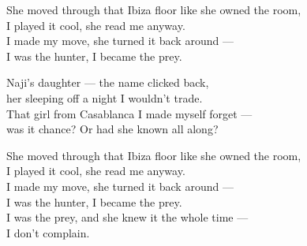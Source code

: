 \begin{lyrics}
She moved through that Ibiza floor like she owned the room,\\
I played it cool, she read me anyway.\\
I made my move, she turned it back around —\\
I was the hunter, I became the prey.

Naji's daughter — the name clicked back,\\
her sleeping off a night I wouldn't trade.\\
That girl from Casablanca I made myself forget —\\
was it chance? Or had she known all along?

She moved through that Ibiza floor like she owned the room,\\
I played it cool, she read me anyway.\\
I made my move, she turned it back around —\\
I was the hunter, I became the prey.\\
I was the prey, and she knew it the whole time —\\
I don't complain.
\end{lyrics}
